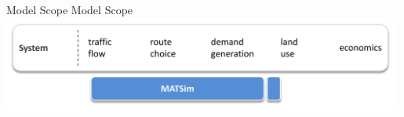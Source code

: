 \createfigure%
{Model Scope}%
{Model Scope}%
{\label{fig:scope}}%
{\includegraphics[width=0.99\textwidth, angle=0]{understanding/figures/scope.pdf}}%
{}
%

%
%

